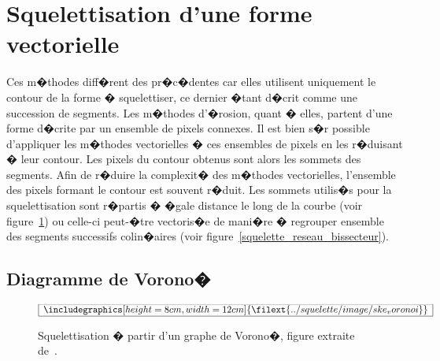 \section{Squelettisation d'une forme vectorielle}



Ces m�thodes diff�rent des pr�c�dentes car elles utilisent uniquement le contour de la forme � squelettiser, ce dernier �tant d�crit comme une succession de segments. Les m�thodes d'�rosion, quant � elles, partent d'une forme d�crite par un ensemble de pixels connexes. Il est bien s�r possible d'appliquer les m�thodes vectorielles � ces ensembles de pixels en les r�duisant � leur contour. Les pixels du contour obtenus sont alors les sommets des segments. Afin de r�duire la complexit� des m�thodes vectorielles, l'ensemble des pixels formant le contour est souvent r�duit. Les sommets utilis�s pour la squelettisation sont r�partis � �gale distance le long de la courbe (voir figure~\ref{squelette_voronoi}) ou celle-ci peut-�tre vectoris�e de mani�re � regrouper ensemble des segments successifs colin�aires (voir figure~\ref{squelette_reseau_bissecteur}).



\subsection{Diagramme de Vorono�}
\label{ske_voronoi_ske_ske}

            \begin{figure}[ht]
        $$\frame{$\begin{array}[c]{c}\includegraphics[height=8cm, width=12cm]
        {\filext{../squelette/image/ske_voronoi}}\end{array}$}$$
        \caption{    Squelettisation � partir d'un graphe de Vorono�, figure extraite de~.}
        \label{squelette_voronoi}
            \end{figure}



